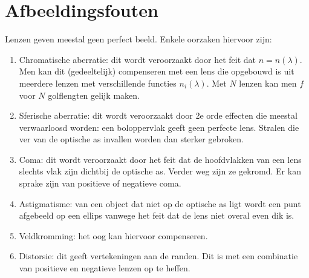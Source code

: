 \section{Afbeeldingsfouten}
Lenzen geven meestal geen perfect beeld. Enkele oorzaken hiervoor zijn:
\begin{enumerate}
\item Chromatische aberratie: dit wordt veroorzaakt door het feit dat
      $n=n(\lambda)$. Men kan dit (gedeeltelijk) compenseren met een lens die
      opgebouwd is uit meerdere lenzen met verschillende functies $n_i(\lambda)$.
      Met $N$ lenzen kan men $f$ voor $N$ golflengten gelijk maken.
\item Sferische aberratie: dit wordt veroorzaakt door 2e orde effecten die
      meestal verwaarloosd worden: een boloppervlak geeft geen perfecte lens.
      Stralen die ver van de optische as invallen worden dan sterker gebroken.
\item Coma: dit wordt veroorzaakt door het feit dat de hoofdvlakken van een
      lens slechts vlak zijn dichtbij de optische as. Verder weg zijn ze
      gekromd. Er kan sprake zijn van positieve of negatieve coma.
\item Astigmatisme: van een object dat niet op de optische as ligt wordt een
      punt afgebeeld op een ellips vanwege het feit dat de lens niet overal
      even dik is.
\item Veldkromming: het oog kan hiervoor compenseren.
\item Distorsie: dit geeft vertekeningen aan de randen. Dit is met een
      combinatie van positieve en negatieve lenzen op te heffen.
\end{enumerate}

